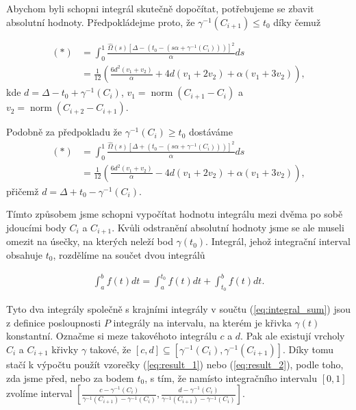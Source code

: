 Abychom byli schopni integrál skutečně dopočítat, potřebujeme se zbavit absolutní
hodnoty. Předpokládejme proto, že $ \gamma^{-1}(C_{i + 1}) \leq t_0$ díky čemuž

\begin{align}
    (*) &= \int_{0}^{1}
        \frac{\widehat{\Omega}(s)
            \left[\Delta - (t_0 - (s \alpha + \gamma^{-1}(C_i)) ) \right]^2}
        {\alpha}
         ds \\
    &= \frac{1}{12} \left(
        \frac{6 d^2 (v_1+v_2 )}{\alpha}
        + 4 d (v_1+2 v_2 )
        + \alpha (v_1+3 v_2 ) \right), \label{eq:result_1}
\end{align}
kde $ d = \Delta - t_0 + \gamma^{-1}(C_i) $,
$ v_1 = \operatorname{norm}(C_{i + 1} - C_i) $ a
$ v_2 = \operatorname{norm}(C_{i + 2} - C_{i + 1})$.

Podobně za předpokladu že $ \gamma^{-1}(C_i) \geq t_0$ dostáváme
\begin{align}
    (*) &= \int_{0}^{1}
        \frac{\widehat{\Omega}(s)
            \left[\Delta + (t_0 - (s \alpha + \gamma^{-1}(C_i)) ) \right]^2}
        {\alpha}
         ds \\
    &= \frac{1}{12} \left(
        \frac{6 d^2 (v_1+v_2 )}{\alpha}
        - 4 d (v_1+2 v_2 )
        + \alpha (v_1+3 v_2 ) \right), \label{eq:result_2}
\end{align}
přičemž $ d = \Delta + t_0 - \gamma^{-1}(C_i) $.

Tímto způsobem jsme schopni vypočítat hodnotu integrálu mezi dvěma po sobě jdoucími
body $ C_i $ a $ C_{i + 1} $. Kvůli odstranění absolutní hodnoty jsme se ale
museli omezit na úsečky, na kterých neleží bod $ \gamma(t_0) $. Integrál, jehož
integrační interval obsahuje $ t_0 $, rozdělíme na součet dvou
integrálů

\begin{align*}
    \int_{a}^{b} f(t) dt = \int_{a}^{t_0} f(t) dt + \int_{t_0}^{b} f(t) dt.
\end{align*}

Tyto dva integrály společně s krajními integrály v součtu (\ref{eq:integral_sum})
jsou z definice posloupnosti $ P $ integrály na intervalu, na kterém je křivka
$ \gamma(t) $ konstantní. Označme si meze takovéhoto integrálu $ c $ a $ d $.
Pak ale existují vrcholy $ C_i $ a $ C_{i + 1} $ křivky $ \gamma $ takové, že
$ [c, d] \subseteq [\gamma^{-1}(C_i), \gamma^{-1}(C_{i + 1})] $. Díky tomu stačí
k výpočtu použít vzorečky (\ref{eq:result_1}) nebo (\ref{eq:result_2}), podle
toho, zda jsme před, nebo za bodem $ t_0 $, s tím, že
namísto integračního intervalu $ [0, 1] $ zvolíme interval
$ \left[ \frac{c - \gamma^{-1}(C_i)}{\gamma^{-1}(C_{i + 1}) - \gamma^{-1}(C_i)},
 \frac{d - \gamma^{-1}(C_i)}{\gamma^{-1}(C_{i + 1}) - \gamma^{-1}(C_i)} \right] $.

